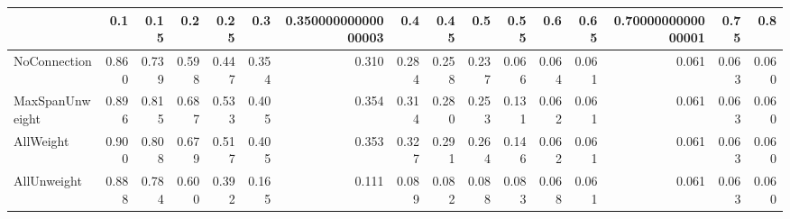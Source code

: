\begin{tabular}{lrrrrrrrrrrrrrrr}
\toprule
{} &   0.1 &  0.15 &   0.2 &  0.25 &   0.3 & 0.35000000000000003 &   0.4 &  0.45 &   0.5 &  0.55 &   0.6 &  0.65 & 0.7000000000000001 &  0.75 &   0.8 \\
\midrule
NoConnection    & 0.860 & 0.739 & 0.598 & 0.447 & 0.354 &               0.310 & 0.284 & 0.258 & 0.237 & 0.066 & 0.064 & 0.061 &              0.061 & 0.063 & 0.060 \\
MaxSpanUnweight & 0.896 & 0.815 & 0.687 & 0.533 & 0.405 &               0.354 & 0.314 & 0.280 & 0.253 & 0.131 & 0.062 & 0.061 &              0.061 & 0.063 & 0.060 \\
AllWeight       & 0.900 & 0.808 & 0.679 & 0.517 & 0.405 &               0.353 & 0.327 & 0.291 & 0.264 & 0.146 & 0.062 & 0.061 &              0.061 & 0.063 & 0.060 \\
AllUnweight     & 0.888 & 0.784 & 0.600 & 0.392 & 0.165 &               0.111 & 0.089 & 0.082 & 0.088 & 0.083 & 0.068 & 0.061 &              0.061 & 0.063 & 0.060 \\
\bottomrule
\end{tabular}
